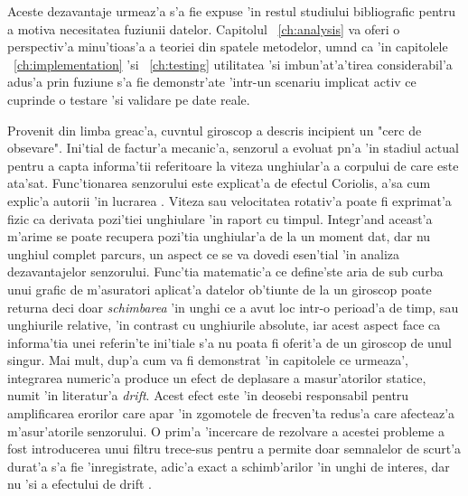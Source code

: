 \documentclass[12pt,a4paper,twoside]{report}
\begin{document}
Aceste dezavantaje urmeaz'a s'a fie expuse 'in restul studiului bibliografic pentru a motiva necesitatea fuziunii datelor. Capitolul ~\ref{ch:analysis} va oferi o perspectiv'a minu'tioas'a a teoriei din spatele metodelor, um\ia nd ca 'in capitolele  ~\ref{ch:implementation} 'si ~\ref{ch:testing} utilitatea 'si imbun'at'a'tirea considerabil'a adus'a prin fuziune s'a fie demonstr'ate 'intr-un scenariu implicat activ ce cuprinde o testare 'si validare pe date reale. 

\vspace{5px}

Provenit din limba greac'a, cuv\ia ntul giroscop a descris incipient un "cerc de obsevare". Ini'tial de factur'a mecanic'a, senzorul a evoluat p\ia n'a 'in stadiul actual pentru a capta informa'tii referitoare la viteza unghiular'a a corpului de care este ata'sat. Func'tionarea senzorului este explicat'a de efectul Coriolis, a'sa cum explic'a autorii 'in lucrarea \cite{s17102284}. Viteza sau velocitatea rotativ'a poate fi exprimat'a fizic ca derivata pozi'tiei unghiulare 'in raport cu timpul. Integr'and aceast'a m'arime se poate recupera pozi'tia unghiular'a de la un moment dat, dar nu unghiul complet parcurs, un aspect ce se va dovedi esen'tial 'in analiza dezavantajelor senzorului. Func'tia matematic'a ce define'ste aria de sub curba unui grafic de m'asuratori aplicat'a datelor ob'tiunte de la un giroscop poate returna deci doar \textit{schimbarea} 'in unghi ce a avut loc intr-o perioad'a de timp, sau unghiurile relative, 'in contrast cu unghiurile absolute, iar acest aspect face ca informa'tia unei referin'te ini'tiale s'a nu poata fi oferit'a de un giroscop de unul singur. Mai mult, dup'a cum va fi demonstrat 'in capitolele ce urmeaza', integrarea numeric'a produce un efect de deplasare a masur'atorilor statice, numit 'in literatur'a \textit{drift}. Acest efect este 'in deosebi responsabil pentru amplificarea erorilor care apar 'in zgomotele de frecven'ta redus'a care afecteaz'a m'asur'atorile senzorului. O prim'a 'incercare de rezolvare a acestei probleme a fost introducerea unui filtru trece-sus pentru a permite doar semnalelor de scurt'a durat'a s'a fie 'inregistrate, adic'a exact a schimb'arilor 'in unghi de interes, dar nu 'si a efectului de drift \cite{7334442}. 

\vspace{5px}
\end{document}
